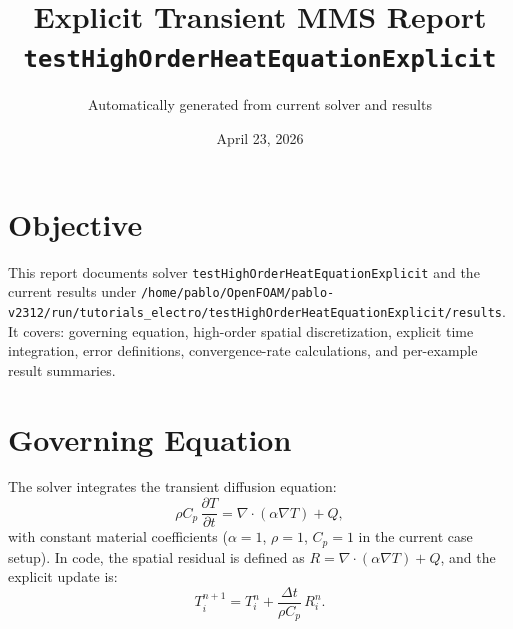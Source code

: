 \documentclass[11pt,a4paper]{article}
\title{Explicit Transient MMS Report\\
\large \texttt{testHighOrderHeatEquationExplicit}}
\author{Automatically generated from current solver and results}
\date{April 23, 2026}
\begin{document}
\maketitle
\section{Objective}
This report documents solver \texttt{testHighOrderHeatEquationExplicit} and the current results under \texttt{/home/pablo/OpenFOAM/pablo-v2312/run/tutorials\_electro/testHighOrderHeatEquationExplicit/results}.
It covers: governing equation, high-order spatial discretization, explicit time integration, error definitions, convergence-rate calculations, and per-example result summaries.
\section{Governing Equation}
The solver integrates the transient diffusion equation:
\begin{equation}
\rho C_p\,\frac{\partial T}{\partial t} = \nabla\cdot(\alpha\nabla T) + Q,
\end{equation}
with constant material coefficients ($\alpha=1$, $\rho=1$, $C_p=1$ in the current case setup).
In code, the spatial residual is defined as $R = \nabla\cdot(\alpha\nabla T)+Q$, and the explicit update is:
\begin{equation}
T_i^{n+1}=T_i^n + \frac{\Delta t}{\rho C_p}\,R_i^n.
\end{equation}
\end{document}
